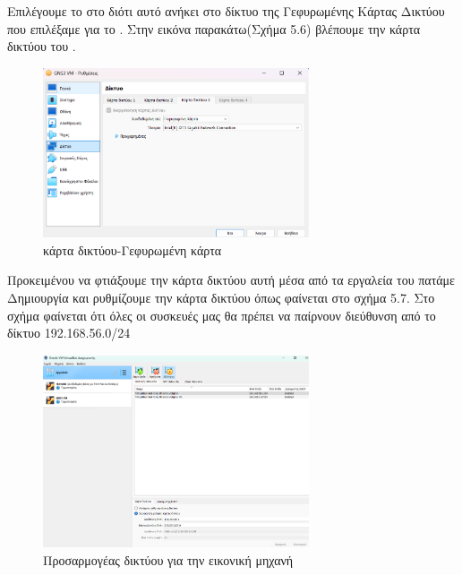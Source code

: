Επιλέγουμε το  στο  διότι αυτό ανήκει στο δίκτυο της Γεφυρωμένης Κάρτας Δικτύου που επιλέξαμε για το . Στην εικόνα παρακάτω(Σχήμα 5.6) βλέπουμε την κάρτα δικτύου του .

\FloatBarrier

\begin{figure}[htb]
	\centering
	\includegraphics[width=0.7\textwidth]{graphics/GNS3_network_adapter.png}
	\caption{ κάρτα δικτύου-Γεφυρωμένη κάρτα }
\end{figure}

\FloatBarrier

\noindent Προκειμένου να φτιάξουμε την κάρτα δικτύου αυτή μέσα από τα εργαλεία του  πατάμε Δημιουργία 
και ρυθμίζουμε την κάρτα δικτύου όπως φαίνεται στο σχήμα 5.7. Στο σχήμα φαίνεται ότι όλες οι συσκευές μας θα πρέπει να παίρνουν  διεύθυνση από το δίκτυο 192.168.56.0/24


\FloatBarrier

\begin{figure}[htb]
	\centering
	\includegraphics[width=0.7\textwidth]{graphics/GNS3_Network.png}
	\caption{Προσαρμογέας δικτύου για την εικονική μηχανή }
\end{figure}

